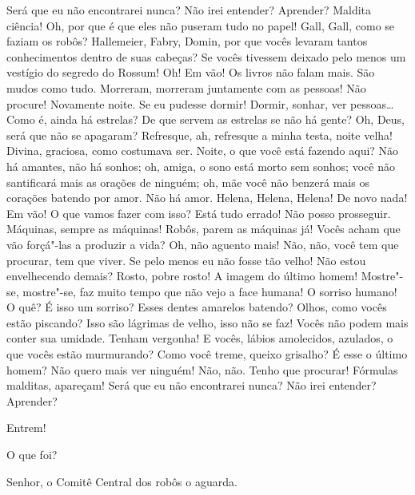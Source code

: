  Será que eu não encontrarei nunca? Não irei entender?
Aprender? Maldita ciência! Oh, por que é que eles não puseram tudo no papel! 
Gall, Gall, como se faziam os robôs? Hallemeier, Fabry, Domin, por que
vocês levaram tantos conhecimentos dentro de suas cabeças? Se vocês tivessem
deixado pelo menos um vestígio do segredo do Rossum! Oh!  Em vão! Os livros não falam mais. São mudos como tudo.
Morreram, morreram juntamente com as pessoas! Não procure!  Novamente noite. Se eu pudesse dormir! Dormir,
sonhar, ver pessoas\ldots{} Como é, ainda há estrelas? De que servem as estrelas se
não há gente? Oh, Deus, será que não se apagaram? Refresque, ah, refresque a
minha testa, noite velha! Divina, graciosa, como costumava ser. Noite, o que
você está fazendo aqui? Não há amantes, não há sonhos; oh, amiga, o sono está
morto sem sonhos; você não santificará mais as orações de ninguém; oh, mãe você
não benzerá mais os corações batendo por amor. Não há amor. Helena, Helena,
Helena!  
De novo nada! Em vão! O que vamos fazer com isso?
 Está tudo errado! Não posso prosseguir. 
 Máquinas, sempre as máquinas! Robôs, parem as máquinas já!
Vocês acham que vão forçá"-las a produzir a vida? Oh, não aguento mais!
 Não, não, você tem que procurar, tem que viver. Se
pelo menos eu não fosse tão velho! Não estou envelhecendo demais?
 Rosto, pobre rosto! A imagem do último homem!
Mostre"-se, mostre"-se, faz muito tempo que não vejo a face humana! O sorriso
humano! O quê? É isso um sorriso? Esses dentes amarelos batendo?
Olhos, como vocês estão piscando? Isso são lágrimas de velho, isso não
se faz! Vocês não podem mais conter sua umidade. Tenham vergonha! E vocês,
lábios amolecidos, azulados, o que vocês estão murmurando? Como você treme,
queixo grisalho? É esse o último homem?  Não quero mais ver ninguém! 
 Não, não.
Tenho que procurar! Fórmulas malditas, apareçam!  Será que 
eu não encontrarei nunca? Não irei entender? Aprender?

 Entrem!

 O que foi?

 Senhor, o Comitê Central dos robôs o aguarda.

